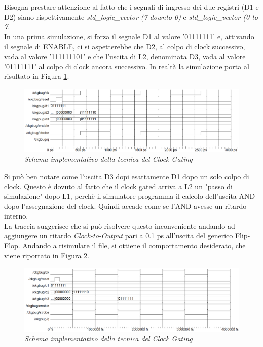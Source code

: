 Bisogna prestare attenzione al fatto che i segnali di ingresso dei due registri (D1 e D2) siano rispettivamente \textit{std\_logic\_vector (7 downto 0)} e \textit{std\_logic\_vector (0 to 7}. \\
In una prima simulazione, si forza il segnale D1 al valore '01111111' e, attivando il segnale di ENABLE, ci si aspetterebbe che D2, al colpo di clock successivo, vada al valore '111111101' e che l'uscita di L2, denominata D3, vada al valore '01111111' al colpo di clock ancora successivo. In realtà la simulazione porta al risultato in Figura \ref{clock_gat1}.
\begin{figure}[!htb]
	\centering
	\includegraphics[scale=0.8]{immagini/clock_gating1}
	\caption{\textit{Schema implementativo della tecnica del Clock Gating}}
	\label{clock_gat1}
\end{figure}
Si può ben notare come l'uscita D3 dopi esattamente D1 dopo un solo colpo di clock. Questo è dovuto al fatto che il clock gated arriva a L2 un "passo di simulazione" dopo L1, perchè il simulatore programma il calcolo dell'uscita AND dopo l'assegnazione del clock. Quindi accade come se l'AND avesse un ritardo interno. \\
La traccia suggerisce che si può risolvere questo inconveniente andando ad aggiungere un ritardo \textit{Clock-to-Output} pari a 0.1 ps all'uscita del generico Flip-Flop. Andando a risimulare il file, si ottiene il comportamento desiderato, che viene riportato in Figura \ref{clock_gat2}. \\
\newpage
\begin{figure}[!htb]
	\centering
	\includegraphics[scale=0.8]{immagini/clock_gating2}
	\caption{\textit{Schema implementativo della tecnica del Clock Gating}}
	\label{clock_gat2}
\end{figure}
